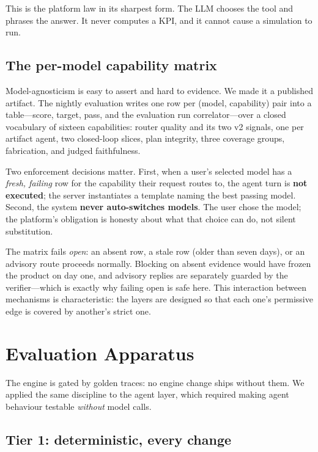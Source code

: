 \documentclass[conference]{IEEEtran}
\begin{document}
This is the platform law in its sharpest form. The LLM chooses the tool and
phrases the answer. It never computes a KPI, and it cannot cause a simulation to
run.

\subsection{The per-model capability matrix}
\label{sec:matrix}

Model-agnosticism is easy to assert and hard to evidence. We made it a published
artifact. The nightly evaluation writes one row per (model, capability) pair into
a table---score, target, pass, and the evaluation run correlator---over a closed
vocabulary of sixteen capabilities: router quality and its two v2 signals, one
per artifact agent, two closed-loop slices, plan integrity, three coverage
groups, fabrication, and judged faithfulness.

Two enforcement decisions matter. First, when a user's selected model has a
\emph{fresh, failing} row for the capability their request routes to, the agent
turn is \textbf{not executed}; the server instantiates a template naming the best
passing model. Second, the system \textbf{never auto-switches models}. The user
chose the model; the platform's obligation is honesty about what that choice can
do, not silent substitution.

The matrix fails \emph{open}: an absent row, a stale row (older than seven days),
or an advisory route proceeds normally. Blocking on absent evidence would have
frozen the product on day one, and advisory replies are separately guarded by the
verifier---which is exactly why failing open is safe here. This interaction
between mechanisms is characteristic: the layers are designed so that each one's
permissive edge is covered by another's strict one.

\section{Evaluation Apparatus}
\label{sec:eval}

The engine is gated by golden traces: no engine change ships without them. We
applied the same discipline to the agent layer, which required making agent
behaviour testable \emph{without} model calls.

\subsection{Tier 1: deterministic, every change}
\end{document}
